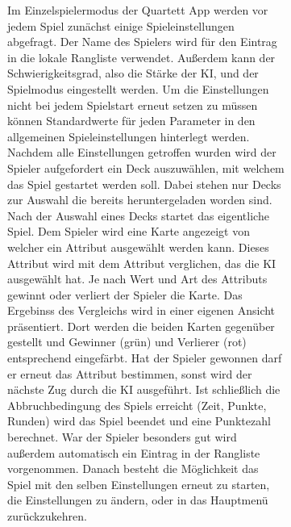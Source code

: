 \documentclass{scrartcl}
\begin{document}
\begin{figure}[!ht]
\begin{figure}[!ht]
\noindent
Im Einzelspielermodus der Quartett App werden vor jedem Spiel zunächst einige
Spieleinstellungen abgefragt. Der Name des Spielers wird für den Eintrag in die
lokale Rangliste verwendet. Außerdem kann der Schwierigkeitsgrad, also die
Stärke der KI, und der Spielmodus eingestellt werden. Um die Einstellungen nicht
bei jedem Spielstart erneut setzen zu müssen können Standardwerte für jeden
Parameter in den allgemeinen Spieleinstellungen hinterlegt werden. Nachdem alle
Einstellungen getroffen wurden wird der Spieler aufgefordert ein Deck
auszuwählen, mit welchem das Spiel gestartet werden soll. Dabei stehen nur Decks
zur Auswahl die bereits heruntergeladen worden sind. Nach der Auswahl eines
Decks startet das eigentliche Spiel. Dem Spieler wird eine Karte angezeigt von
welcher ein Attribut ausgewählt werden kann. Dieses Attribut wird mit dem
Attribut verglichen, das die KI ausgewählt hat. Je nach Wert und Art des
Attributs gewinnt oder verliert der Spieler die Karte. Das Ergebinss des
Vergleichs wird in einer eigenen Ansicht präsentiert. Dort werden die beiden
Karten gegenüber gestellt und Gewinner (grün) und Verlierer (rot) entsprechend
eingefärbt. Hat der Spieler gewonnen darf er erneut das Attribut bestimmen,
sonst wird der nächste Zug durch die KI ausgeführt. Ist schließlich die
Abbruchbedingung des Spiels erreicht (Zeit, Punkte, Runden) wird das Spiel
beendet und eine Punktezahl berechnet. War der Spieler besonders gut wird
außerdem automatisch ein Eintrag in der Rangliste vorgenommen. Danach besteht
die Möglichkeit das Spiel mit den selben Einstellungen erneut zu starten, die
Einstellungen zu ändern, oder in das Hauptmenü zurückzukehren.


\end{figure}
\end{figure}
\end{document}
